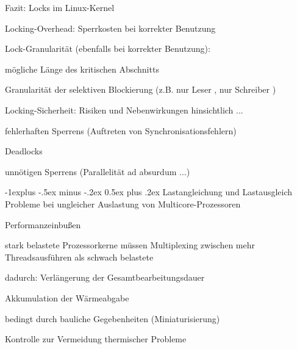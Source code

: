 \documentclass[a4paper]{article}
\makeatletter
\renewcommand{\subsection}{\@startsection{subsection}{2}{0mm}%
 {-1explus -.5ex minus -.2ex}%
 {0.5ex plus .2ex}%
 {\normalfont\normalsize\bfseries}}
\makeatother
\begin{document}
\begin{multicols}{3}
    Fazit: Locks im Linux-Kernel
    \begin{itemize*}
        \item Locking-Overhead: Sperrkosten bei korrekter Benutzung
        \item Lock-Granularität (ebenfalls bei korrekter Benutzung):
        \begin{itemize*}
            \item mögliche Länge des kritischen Abschnitts
            \item Granularität der selektiven Blockierung (z.B. nur Leser , nur Schreiber )
        \end{itemize*}
        \item Locking-Sicherheit: Risiken und Nebenwirkungen hinsichtlich ...
        \begin{itemize*}
            \item fehlerhaften Sperrens (Auftreten von Synchronisationsfehlern)
            \item Deadlocks
            \item unnötigen Sperrens (Parallelität ad absurdum ...)
        \end{itemize*}
    \end{itemize*}

    \subsection{Lastangleichung und Lastausgleich}
    Probleme bei ungleicher Auslastung von Multicore-Prozessoren
    \begin{enumerate*}
        \item Performanzeinbußen
        \begin{itemize*}
            \item stark belastete Prozessorkerne müssen Multiplexing zwischen mehr Threadsausführen als schwach belastete
            \item dadurch: Verlängerung der Gesamtbearbeitungsdauer
        \end{itemize*}
        \item Akkumulation der Wärmeabgabe
        \begin{itemize*}
            \item bedingt durch bauliche Gegebenheiten (Miniaturisierung)
            \item Kontrolle zur Vermeidung thermischer Probleme
        \end{itemize*}
    \end{enumerate*}


\end{multicols}
\end{document}
